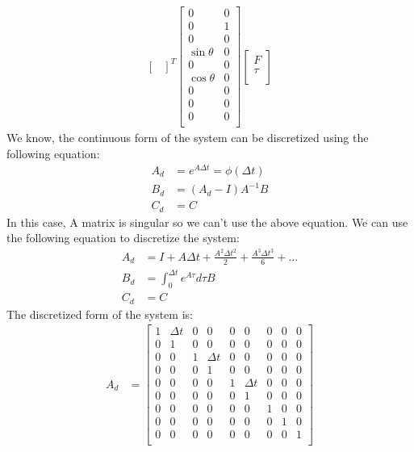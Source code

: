 \documentclass[12pt]{article}
\begin{document}
\begin{align*}
\begin{bmatrix}
        \end{bmatrix}^{T} \begin{bmatrix}
            0 & 0 \\
            0 & 1 \\
            0 & 0 \\
            \sin{\theta} & 0 \\
            0 & 0 \\
            \cos{\theta} & 0 \\
            0 & 0 \\
            0 & 0 \\
            0 & 0 \\
        \end{bmatrix} \begin{bmatrix}
            F \\
            \tau \\
        \end{bmatrix}
\end{align*}
We know, the continuous form of the system can be discretized using the following equation:
\begin{align*}
    A_d &= e^{A \Delta t}  = \phi(\Delta t) \\
    B_d &= (A_d - I) A^{-1} B \\
    C_d &= C
\end{align*}
In this case, A matrix is singular so we can't use the above equation. We can use the following equation to discretize the system:
\begin{align*}
    A_d &= I + A \Delta t + \frac{A^2 \Delta t^2}{2} + \frac{A^3 \Delta t^3}{6} + \ldots \\
    B_d &= \int_{0}^{\Delta t} e^{A \tau} d\tau B \\
    C_d &= C
\end{align*}
The discretized form of the system is:
\begin{align*}
    A_d &= \begin{bmatrix}
        1 & \Delta t & 0 & 0 & 0 & 0 & 0 & 0 & 0 \\
        0 & 1 & 0 & 0 & 0 & 0 & 0 & 0 & 0 \\
        0 & 0 & 1 & \Delta t & 0 & 0 & 0 & 0 & 0 \\
        0 & 0 & 0 & 1 & 0 & 0 & 0 & 0 & 0 \\
        0 & 0 & 0 & 0 & 1 & \Delta t & 0 & 0 & 0 \\
        0 & 0 & 0 & 0 & 0 & 1 & 0 & 0 & 0 \\
        0 & 0 & 0 & 0 & 0 & 0 & 1 & 0 & 0 \\
        0 & 0 & 0 & 0 & 0 & 0 & 0 & 1 & 0 \\
        0 & 0 & 0 & 0 & 0 & 0 & 0 & 0 & 1 \\
    \end{bmatrix} \\
\end{align*}
\end{document}
